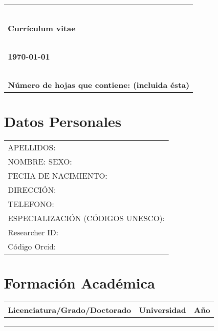 \documentclass[9pt]{article}
\begin{document}



\thispagestyle{empty}

\mbox{ }

\vspace{4cm}

\begin{tabular}{l}
{\huge\bf }\\
~\\
{\Large\bf Currículum vitae}\\
~\\
{\Large\bf \today}\\
~\\
{\Large \bf Número de hojas que contiene: \pageref{end} (incluida
  ésta)} 
\end{tabular}



\newpage




\tableofcontents

\newpage

\section{Datos Personales}
\begin{tabular}{l}
  APELLIDOS:  \\
  NOMBRE:  SEXO:   \\
  FECHA DE NACIMIENTO:   \\
  DIRECCIÓN:  \\
  TELEFONO:  \\
  ESPECIALIZACIÓN (CÓDIGOS UNESCO):  \\
  Researcher ID:  \\
  Código Orcid: 
\end{tabular}

\section{Formación Académica}
\begin{tabular}{lll}
  Licenciatura/Grado/Doctorado & Universidad & Año \\
  \hline
   &  &  \\
   &  &  \\
   &  & 
\end{tabular}
\end{document}
